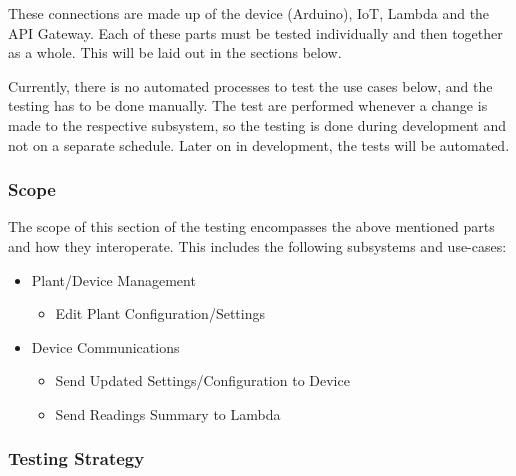 \documentclass{article}
\begin{document}
			These connections are made up of the device (Arduino), IoT, Lambda and the API Gateway. Each of these parts must be tested individually and then together as a whole. This will be laid out in the sections below.
			
			Currently, there is no automated processes to test the use cases below, and the testing has to be done manually. The test are performed whenever a change is made to the respective subsystem, so the testing is done during development and not on a separate schedule. Later on in development, the tests will be automated.
		\subsubsection{Scope}
			 The scope of this section of the testing encompasses the above mentioned parts and how they interoperate. This includes the following subsystems and use-cases:
			 \begin{itemize}
			 	\item Plant/Device Management
					\begin{itemize}
						\item Edit Plant Configuration/Settings
					\end{itemize}
			 	\item Device Communications
				 	\begin{itemize}
				 		\item Send Updated Settings/Configuration to Device
				 		\item Send Readings Summary to Lambda
				 	\end{itemize}
			 \end{itemize}
			 
		\subsubsection{Testing Strategy}
\end{document}

